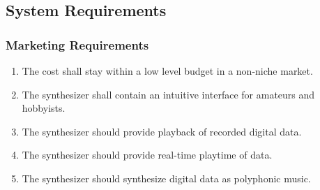 \documentclass[bibtotocnumbered,abstract=on,paper=a4,fontsize=12pt,parskip=on,halfparskip=on]{scrartcl}		%
\begin{document}
  \subsection{System Requirements}
    \subsubsection{Marketing Requirements}
      \begin{enumerate}
        \item The cost shall stay within a low level budget in a non-niche market.
        \item The synthesizer shall contain an intuitive interface for amateurs and hobbyists.
        \item The synthesizer should provide playback of recorded digital data.
        \item The synthesizer should provide real-time playtime of data.
        \item The synthesizer should synthesize digital data as polyphonic music.
      \end{enumerate}
\end{document}
